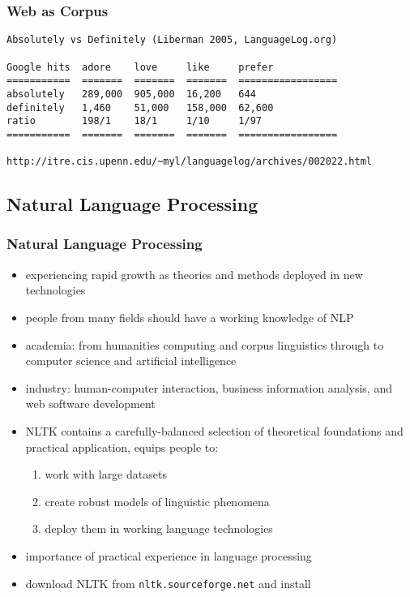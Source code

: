 \documentclass[presentation]{beamer}
\begin{document}
\begin{frame}[fragile]
\frametitle{Web as Corpus}

\begin{verbatim}
Absolutely vs Definitely (Liberman 2005, LanguageLog.org)

Google hits  adore    love     like     prefer
===========  =======  =======  =======  =================
absolutely   289,000  905,000  16,200   644
definitely   1,460    51,000   158,000  62,600
ratio        198/1    18/1     1/10     1/97
===========  =======  =======  =======  =================

http://itre.cis.upenn.edu/~myl/languagelog/archives/002022.html
\end{verbatim}
\end{frame}

\subsection{Natural Language Processing}

\begin{frame}
\frametitle{Natural Language Processing}
\begin{itemize}
\item experiencing rapid growth as theories and methods deployed in
new technologies
\item people from many fields should have a working knowledge of NLP
\item academia: from humanities computing and corpus linguistics through to computer science and
artificial intelligence
\item industry: human-computer interaction, business information analysis, and web
software development
\item NLTK contains a carefully-balanced selection of theoretical foundations and
    practical application, equips people to:
  \begin{enumerate}
  \item work with large datasets
  \item create robust models of linguistic phenomena
  \item deploy them in working language technologies
  \end{enumerate}
\item importance of practical experience in language processing
\item download NLTK from \texttt{nltk.sourceforge.net} and install
\end{itemize}
\end{frame}
\end{document}
